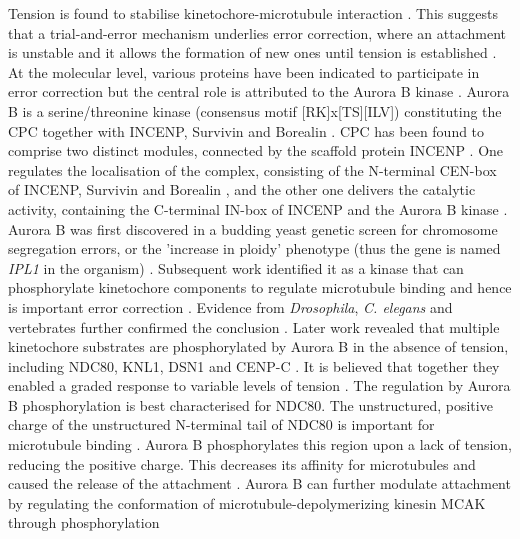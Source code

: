 Tension is found to stabilise kinetochore-microtubule interaction \citep{Nicklas1969CHROMOSOMEChromosomes}. This suggests that a trial-and-error mechanism underlies error correction, where an attachment is unstable and it allows the formation of new ones until tension is established \citep{Nicklas1997HowChromosomes, Tanaka2010Kinetochore-microtubuleBi-orientation, Krenn2015TheSignaling}. At the molecular level, various proteins have been indicated to participate in error correction \citep{Tanaka2022SWAPCorrection} but the central role is attributed to the Aurora B kinase \citep{Krenn2015TheSignaling, Lampson2011SensingFunction, McVey2021AuroraSegregation, Hindriksen2017TheLocalization}. Aurora B is a serine/threonine kinase (consensus motif [RK]x[TS][ILV]) \citep{Cheeseman2002Phospho-regulationIpl1p, Francisco1994TypeSegregation} constituting the CPC together with INCENP, Survivin and Borealin \citep{Gassmann2004BorealinSpindle, Romano2003CSC-1ICP-1, Cooke1987TheMitosis.}. CPC has been found to comprise two distinct modules, connected by the scaffold protein INCENP \citep{Carmena2012TheMitosis}. One regulates the localisation of the complex, consisting of the N-terminal CEN-box of INCENP, Survivin and Borealin \citep{Jeyaprakash2011StructuralComplex, Jeyaprakash2007StructureTogether}, and the other one delivers the catalytic activity, containing the C-terminal IN-box of INCENP and the Aurora B kinase \citep{Kang2001FunctionalSegregation, Bishop2002PhosphorylationActivity, Sessa2005MechanismHesperadin}. Aurora B was first discovered in a budding yeast genetic screen for chromosome segregation errors, or the 'increase in ploidy' phenotype (thus the gene is named \textit{IPL1} in the organism) \citep{Chan1993IsolationYeast.}. Subsequent work identified it as a kinase that can phosphorylate kinetochore components to regulate microtubule binding and hence is important error correction \citep{Cheeseman2002Phospho-regulationIpl1p, Francisco1994TypeSegregation, Biggins1999TheYeast, Tanaka2002EvidenceConnections}. Evidence from \textit{Drosophila}, \textit{C. elegans} and vertebrates further confirmed the conclusion \citep{Giet1999Aurora/Ipl1p-relatedKinases}. Later work revealed that multiple kinetochore substrates are phosphorylated by Aurora B in the absence of tension, including NDC80, KNL1, DSN1 and CENP-C \citep{DeLuca2006KinetochoreHec1, Welburn2010AuroraInterface, Zhou2017PhosphorylationMitosis, Bonner2019EnrichmentAssembly}. It is believed that together they enabled a graded response to variable levels of tension \citep{Welburn2010AuroraInterface}. The regulation by Aurora B phosphorylation is best characterised for NDC80. The unstructured, positive charge of the unstructured N-terminal tail of NDC80 is important for microtubule binding \citep{Ciferri2008ImplicationsComplex, Wei2006StructureDomain, Umbreit2012TheDynamics}. Aurora B phosphorylates this region upon a lack of tension, reducing the positive charge. This decreases its affinity for microtubules and caused the release of the attachment \citep{DeLuca2006KinetochoreHec1, DeLuca2011TemporalMitosis, Ciferri2008ImplicationsComplex, Cheeseman2006TheKinetochore}. Aurora B can further modulate attachment by regulating the conformation of microtubule-depolymerizing kinesin MCAK through phosphorylation 
